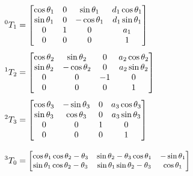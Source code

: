 \begin{align}
    ^0T_1 & =
    \begin{bmatrix}
        \cos{\theta_{1}} & 0 & \sin{\theta_{1}}   & d_{1} \cos{\theta_{1}} \\
        \sin{\theta_{1}} & 0 & - \cos{\theta_{1}} & d_{1} \sin{\theta_{1}} \\
        0                & 1 & 0                  & a_{1}                  \\
        0                & 0 & 0                  & 1                      \\
    \end{bmatrix}\label{eq:t01}       \\[1ex]
    ^1T_2 & =
    \begin{bmatrix}
        \cos{\theta_{2}} & \sin{\theta_{2}}   & 0  & a_{2} \cos{\theta_{2}} \\
        \sin{\theta_{2}} & - \cos{\theta_{2}} & 0  & a_{2} \sin{\theta_{2}} \\
        0                & 0                  & -1 & 0                      \\
        0                & 0                  & 0  & 1                      \\
    \end{bmatrix}\label{eq:t12}       \\[1ex]
    ^2T_3 & =
    \begin{bmatrix}
        \cos{\theta_{3}} & - \sin{\theta_{3}} & 0 & a_{3} \cos{\theta_{3}} \\
        \sin{\theta_{3}} & \cos{\theta_{3}}   & 0 & a_{3} \sin{\theta_{3}} \\
        0                & 0                  & 1 & 0                      \\
        0                & 0                  & 0 & 1                      \\
    \end{bmatrix}\label{eq:t23}       \\[2ex]
    ^3T_0 & =
    {\small\begin{bmatrix}
        \cos{\theta_{1}} \cos{\theta_{2} - \theta_{3}} & \sin{\theta_{2} - \theta_{3}} \cos{\theta_{1}}                                                                    & - \sin{\theta_{1}} \\
        \sin{\theta_{1}} \cos{\theta_{2} - \theta_{3}} & \sin{\theta_{1}} \sin{\theta_{2} - \theta_{3}}                                                                    & \cos{\theta_{1}}   \\

\end{bmatrix}}
\end{align}
